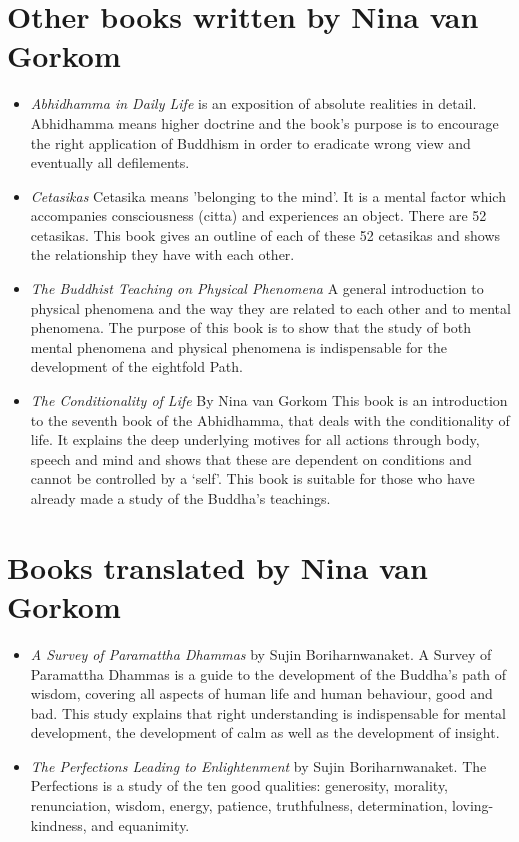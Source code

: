 \documentclass{book}
\begin{document}
\section {Other books written by Nina van Gorkom}

\begin {itemize}

\item
\emph{Abhidhamma in Daily Life} is an exposition of absolute realities
in detail. Abhidhamma means higher doctrine and the book's purpose
is to encourage the right application of Buddhism in order to eradicate
wrong view and eventually all defilements.

\item
\emph{Cetasikas} Cetasika means 'belonging to the mind'. It is a mental
factor which accompanies consciousness (citta) and experiences an
object. There are 52 cetasikas. This book gives an outline of each
of these 52 cetasikas and shows the relationship they have with each
other.
\item
\emph{The Buddhist Teaching on Physical Phenomena} A general introduction
to physical phenomena and the way they are related to each other and
to mental phenomena. The purpose of this book is to show that the
study of both mental phenomena and physical phenomena is indispensable
for the development of the eightfold Path.

\item
\emph{The Conditionality of Life} By Nina van Gorkom
This book is an introduction to the seventh book of the Abhidhamma,
that deals with the conditionality of life. It explains the deep underlying
motives for all actions through body, speech and mind and shows that these are
dependent on conditions and cannot be controlled by a ‘self’. This book is suitable for those who have already made a study of
the Buddha’s teachings.
\end {itemize}

\section{Books translated by Nina van Gorkom}
\begin {itemize}
\item
\emph{A Survey of Paramattha Dhammas} by Sujin Boriharnwanaket. A Survey of Paramattha Dhammas is a guide to the development of the Buddha's path of wisdom, covering all aspects of human life and human behaviour, good and bad. This study explains that right understanding is indispensable for mental
development, the development of calm as well as the development of
insight.
\item
\emph{The Perfections Leading to Enlightenment} by Sujin Boriharnwanaket. The Perfections is a study of the ten good qualities: generosity, morality, renunciation,
wisdom, energy, patience, truthfulness, determination, loving-kindness,
and equanimity.

\end {itemize}
\end{document}
